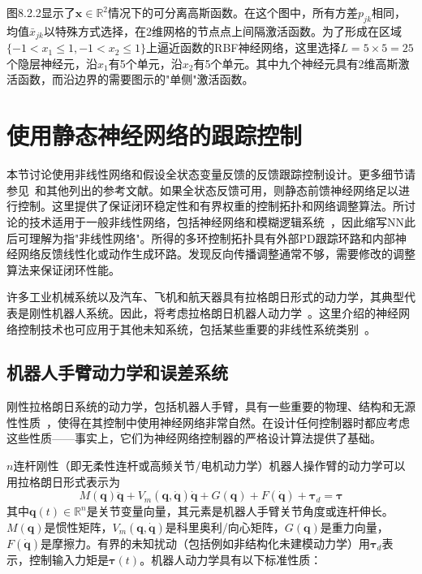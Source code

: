 \documentclass[12pt,a4paper]{ctexart}
\begin{document}
图8.2.2显示了$\bm{x} \in \mathbb{R}^2$情况下的可分离高斯函数。在这个图中，所有方差$p_{jk}$相同，均值$\bar{x}_{jk}$以特殊方式选择，在2维网格的节点点上间隔激活函数。为了形成在区域$\{-1 < x_1 \leq 1, -1 < x_2 \leq 1\}$上逼近函数的RBF神经网络，这里选择$L = 5 \times 5 = 25$个隐层神经元，沿$x_1$有5个单元，沿$x_2$有5个单元。其中九个神经元具有2维高斯激活函数，而沿边界的需要图示的"单侧"激活函数。

\section{使用静态神经网络的跟踪控制}

本节讨论使用非线性网络和假设全状态变量反馈的反馈跟踪控制设计。更多细节请参见~\cite{lewis1999}和其他列出的参考文献。如果全状态反馈可用，则静态前馈神经网络足以进行控制。这里提供了保证闭环稳定性和有界权重的控制拓扑和网络调整算法。所讨论的技术适用于一般非线性网络，包括神经网络和模糊逻辑系统~\cite{wang1997,lewis1997}，因此缩写NN此后可理解为指"非线性网络"。所得的多环控制拓扑具有外部PD跟踪环路和内部神经网络反馈线性化或动作生成环路。发现反向传播调整通常不够，需要修改的调整算法来保证闭环性能。

许多工业机械系统以及汽车、飞机和航天器具有拉格朗日形式的动力学，其典型代表是刚性机器人系统。因此，将考虑拉格朗日机器人动力学~\cite{lewis1993,lewis1996}。这里介绍的神经网络控制技术也可应用于其他未知系统，包括某些重要的非线性系统类别~\cite{lewis1999}。

\subsection{机器人手臂动力学和误差系统}

刚性拉格朗日系统的动力学，包括机器人手臂，具有一些重要的物理、结构和无源性性质~\cite{craig1988,lewis1993,slotine1988,spong1989}，使得在其控制中使用神经网络非常自然。在设计任何控制器时都应考虑这些性质——事实上，它们为神经网络控制器的严格设计算法提供了基础。

$n$连杆刚性（即无柔性连杆或高频关节/电机动力学）机器人操作臂的动力学可以用拉格朗日形式表示为
\begin{equation}\label{eq:8.3.1}
M(\bm{q})\ddot{\bm{q}} + V_m(\bm{q},\dot{\bm{q}})\dot{\bm{q}} + G(\bm{q}) + F(\dot{\bm{q}}) + \bm{\tau}_d = \bm{\tau}
\end{equation}
其中$\bm{q}(t) \in \mathbb{R}^n$是关节变量向量，其元素是机器人手臂关节角度或连杆伸长。$M(\bm{q})$是惯性矩阵，$V_m(\bm{q},\dot{\bm{q}})$是科里奥利/向心矩阵，$G(\bm{q})$是重力向量，$F(\dot{\bm{q}})$是摩擦力。有界的未知扰动（包括例如非结构化未建模动力学）用$\bm{\tau}_d$表示，控制输入力矩是$\bm{\tau}(t)$。机器人动力学具有以下标准性质：
\end{document}

